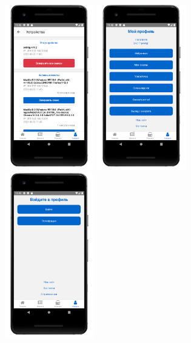 \begin{figure}[!htb]\centering
    \begin{minipage}{0.19\textwidth}
        \centering

        \includegraphics[height=7.2cm]
        {images/mobile/logout/sessions_before.png}
    \end{minipage}
    \begin{minipage}{0.19\textwidth}
        \centering

        \includegraphics[height=7.2cm]
        {images/mobile/logout/logout_button.png}
    \end{minipage}
    \begin{minipage}{0.19\textwidth}
        \centering

        \includegraphics[height=7.2cm]
        {images/mobile/logout/login_page.png}
    \end{minipage}
    \begin{minipage}{0.19\textwidth}
        \centering


\end{minipage}
\end{figure}
